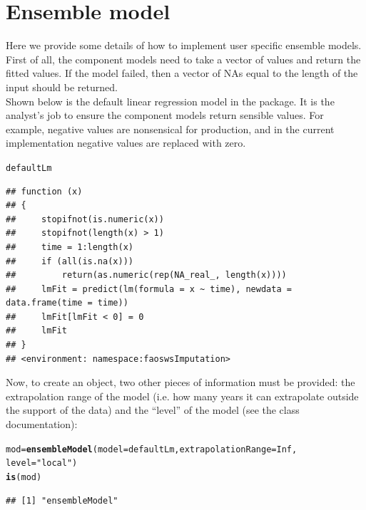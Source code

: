 \documentclass[nojss]{jss}\usepackage[]{graphicx}\usepackage[]{color}
\makeatletter
\newcommand{\hlnum}[1]{\textcolor[rgb]{0.686,0.059,0.569}{#1}}%
\newcommand{\hlstr}[1]{\textcolor[rgb]{0.192,0.494,0.8}{#1}}%
\newcommand{\hlstd}[1]{\textcolor[rgb]{0.345,0.345,0.345}{#1}}%
\newcommand{\hlkwb}[1]{\textcolor[rgb]{0.69,0.353,0.396}{#1}}%
\newcommand{\hlkwc}[1]{\textcolor[rgb]{0.333,0.667,0.333}{#1}}%
\newcommand{\hlkwd}[1]{\textcolor[rgb]{0.737,0.353,0.396}{\textbf{#1}}}%
\newenvironment{kframe}{%
 \def\at@end@of@kframe{}%
 \ifinner\ifhmode%
  \def\at@end@of@kframe{\end{minipage}}%
  \begin{minipage}{\columnwidth}%
 \fi\fi%
 \def\FrameCommand##1{\hskip\@totalleftmargin \hskip-\fboxsep
 \colorbox{shadecolor}{##1}\hskip-\fboxsep
     \hskip-\linewidth \hskip-\@totalleftmargin \hskip\columnwidth}%
 \MakeFramed {\advance\hsize-\width
   \@totalleftmargin\z@ \linewidth\hsize
   \@setminipage}}%
 {\par\unskip\endMakeFramed%
 \at@end@of@kframe}
\newenvironment{knitrout}{}{} %
\makeatother
\begin{document}
\section{Ensemble model}
Here we provide some details of how to implement user specific
ensemble models.\\

First of all, the component models need to take a vector of values and
return the fitted values. If the model failed, then a vector of NAs equal to
the length of the input should be returned.\\

Shown below is the default linear regression model in the package.  It is the
analyst's job to ensure the component models return sensible values. For
example, negative values are nonsensical for production, and in the current
implementation negative values are replaced with zero.

\begin{knitrout}
\color{fgcolor}\begin{kframe}
\begin{alltt}
\hlstd{defaultLm}
\end{alltt}
\begin{verbatim}
## function (x) 
## {
##     stopifnot(is.numeric(x))
##     stopifnot(length(x) > 1)
##     time = 1:length(x)
##     if (all(is.na(x))) 
##         return(as.numeric(rep(NA_real_, length(x))))
##     lmFit = predict(lm(formula = x ~ time), newdata = data.frame(time = time))
##     lmFit[lmFit < 0] = 0
##     lmFit
## }
## <environment: namespace:faoswsImputation>
\end{verbatim}
\end{kframe}
\end{knitrout}

Now, to create an  object, two other pieces of information
must be provided: the extrapolation range of the model (i.e. how many years
it can extrapolate outside the support of the data) and the ``level'' of the
model (see the class documentation):

\begin{knitrout}
\color{fgcolor}\begin{kframe}
\begin{alltt}
\hlstd{mod} \hlkwb{=} \hlkwd{ensembleModel}\hlstd{(}\hlkwc{model} \hlstd{= defaultLm,} \hlkwc{extrapolationRange} \hlstd{=} \hlnum{Inf}\hlstd{,}
                    \hlkwc{level} \hlstd{=} \hlstr{"local"}\hlstd{)}
\hlkwd{is}\hlstd{(mod)}
\end{alltt}
\begin{verbatim}
## [1] "ensembleModel"
\end{verbatim}
\end{kframe}
\end{knitrout}
\end{document}
